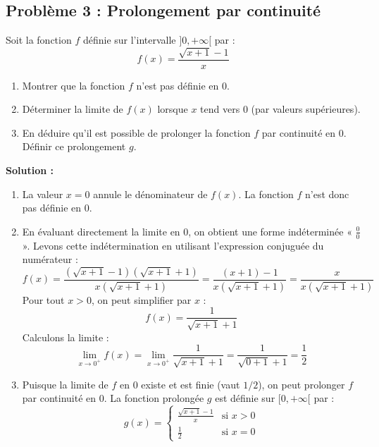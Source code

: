 \subsection*{Problème 3 : Prolongement par continuité}
Soit la fonction $f$ définie sur l'intervalle $]0, +\infty[$ par :
\[
f(x) = \frac{\sqrt{x+1} - 1}{x}
\]
\begin{enumerate}
    \item Montrer que la fonction $f$ n'est pas définie en 0.
    \item Déterminer la limite de $f(x)$ lorsque $x$ tend vers 0 (par valeurs supérieures).
    \item En déduire qu'il est possible de prolonger la fonction $f$ par continuité en 0. Définir ce prolongement $g$.
\end{enumerate}

\textbf{Solution :}
\begin{enumerate}
    \item La valeur $x=0$ annule le dénominateur de $f(x)$. La fonction $f$ n'est donc pas définie en 0.
    
    \item En évaluant directement la limite en 0, on obtient une forme indéterminée « $\frac{0}{0}$ ».
    Levons cette indétermination en utilisant l'expression conjuguée du numérateur :
    \[
    f(x) = \frac{\left(\sqrt{x+1}-1\right)\left(\sqrt{x+1}+1\right)}{x\left(\sqrt{x+1}+1\right)} = \frac{(x+1) - 1}{x\left(\sqrt{x+1}+1\right)} = \frac{x}{x\left(\sqrt{x+1}+1\right)}
    \]
    Pour tout $x > 0$, on peut simplifier par $x$ :
    \[
    f(x) = \frac{1}{\sqrt{x+1} + 1}
    \]
    Calculons la limite :
    \[
    \lim_{x \to 0^+} f(x) = \lim_{x \to 0^+} \frac{1}{\sqrt{x+1} + 1} = \frac{1}{\sqrt{0+1} + 1} = \frac{1}{2}
    \]
    
    \item Puisque la limite de $f$ en 0 existe et est finie (vaut $1/2$), on peut prolonger $f$ par continuité en 0.
    La fonction prolongée $g$ est définie sur $[0, +\infty[$ par :
    \[
    g(x) = 
    \begin{cases}
    \frac{\sqrt{x+1}-1}{x} & \text{si } x > 0 \\
    \frac{1}{2} & \text{si } x = 0
    \end{cases}
    \]
\end{enumerate}

